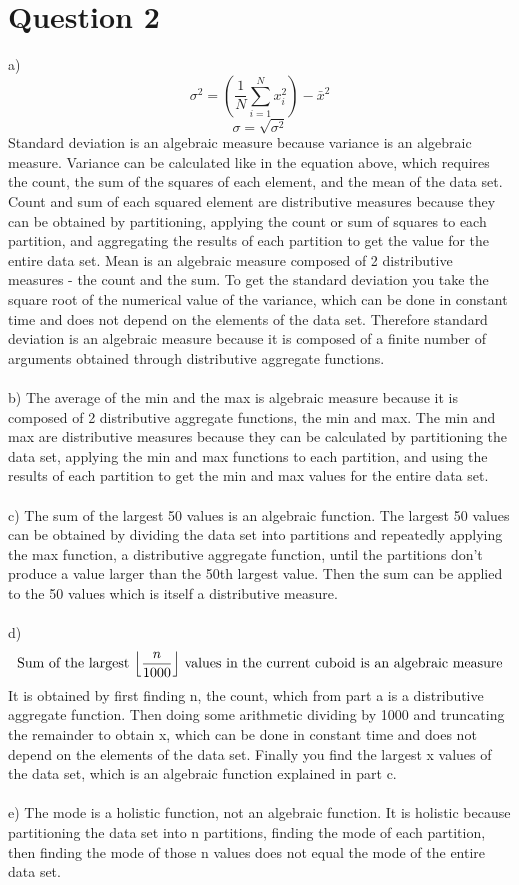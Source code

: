 \documentclass{article}
\DeclarePairedDelimiter\floor{\lfloor}{\rfloor}
\begin{document}
\section{Question 2}
a) $$\sigma^2=(\frac{1}{N}\sum\limits_{i=1}^{N}{x_i^2}) - \bar{x}^2$$ $$\sigma=\sqrt{\sigma^2}$$  Standard deviation is an algebraic measure because variance is an algebraic measure.  Variance can be calculated like in the equation above, which requires the count, the sum of the squares of each element, and the mean of the data set. Count and sum of each squared element are distributive measures because they can be obtained by partitioning, applying the count or sum of squares to each partition, and aggregating the results of each partition to get the value for the entire data set.  Mean is an algebraic measure composed of 2 distributive measures - the count and the sum.  To get the standard deviation you take the square root of the numerical value of the variance, which can be done in constant time and does not depend on the elements of the data set.  Therefore standard deviation is an algebraic measure because it is composed of a finite number of arguments obtained through distributive aggregate functions.\\\\
b) The average of the min and the max is algebraic measure because it is composed of 2 distributive aggregate functions, the min and max.  The min and max are distributive measures because they can be calculated by partitioning the data set, applying the min and max functions to each partition, and using the results of each partition to get the min and max values for the entire data set.\\\\
c) The sum of the largest 50 values is an algebraic function.  The largest 50 values can be obtained by dividing the data set into partitions and repeatedly applying the max function, a distributive aggregate function, until the partitions don't produce a value larger than the 50th largest value.  Then the sum can be applied to the 50 values which is itself a distributive measure.\\\\
d) $$\text{Sum of the largest }\floor*{\frac{n}{1000}}\text{ values in the current cuboid is an algebraic measure}$$ It is obtained by first finding n, the count, which from part a is a distributive aggregate function.  Then doing some arithmetic dividing by 1000 and truncating the remainder to obtain x, which can be done in constant time and does not depend on the elements of the data set.  Finally you find the largest x values of the data set, which is an algebraic function explained in part c.\\\\
e) The mode is a holistic function, not an algebraic function.  It is holistic because partitioning the data set into n partitions, finding the mode of each partition, then finding the mode of those n values does not equal the mode of the entire data set.
\end{document}
